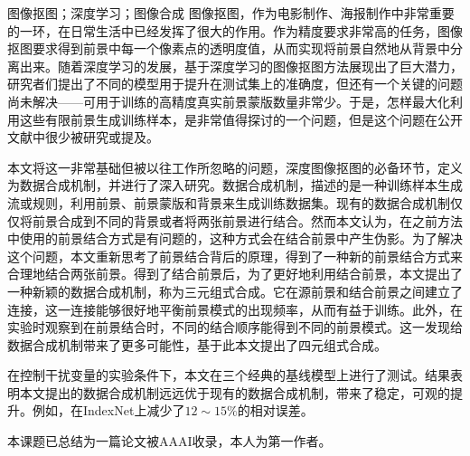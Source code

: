 \documentclass[supercite]{HustGraduPaper}
\begin{document}
	\begin{cnabstract}{图像抠图；深度学习；图像合成}
		图像抠图，作为电影制作、海报制作中非常重要的一环，在日常生活中已经发挥了很大的作用。作为精度要求非常高的任务，图像抠图要求得到前景中每一个像素点的透明度值，从而实现将前景自然地从背景中分离出来。随着深度学习的发展，基于深度学习的图像抠图方法展现出了巨大潜力，研究者们提出了不同的模型用于提升在测试集上的准确度，但还有一个关键的问题尚未解决——可用于训练的高精度真实前景蒙版数量非常少。于是，怎样最大化利用这些有限前景生成训练样本，是非常值得探讨的一个问题，但是这个问题在公开文献中很少被研究或提及。


		本文将这一非常基础但被以往工作所忽略的问题，深度图像抠图的必备环节，定义为数据合成机制，并进行了深入研究。数据合成机制，描述的是一种训练样本生成流或规则，利用前景、前景蒙版和背景来生成训练数据集。现有的数据合成机制仅仅将前景合成到不同的背景或者将两张前景进行结合。然而本文认为，在之前方法中使用的前景结合方式是有问题的，这种方式会在结合前景中产生伪影。为了解决这个问题，本文重新思考了前景结合背后的原理，得到了一种新的前景结合方式来合理地结合两张前景。得到了结合前景后，为了更好地利用结合前景，本文提出了一种新颖的数据合成机制，称为三元组式合成。它在源前景和结合前景之间建立了连接，这一连接能够很好地平衡前景模式的出现频率，从而有益于训练。此外，在实验时观察到在前景结合时，不同的结合顺序能得到不同的前景模式。这一发现给数据合成机制带来了更多可能性，基于此本文提出了四元组式合成。


		在控制干扰变量的实验条件下，本文在三个经典的基线模型上进行了测试。结果表明本文提出的数据合成机制远远优于现有的数据合成机制，带来了稳定，可观的提升。例如，在IndexNet上减少了$12\sim15\%$的相对误差。

        本课题已总结为一篇论文被AAAI收录，本人为第一作者。
		
	\end{cnabstract}
\end{document}
